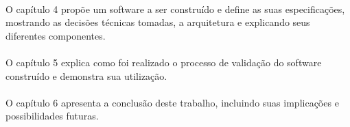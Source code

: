 \paragraph{}O capítulo 4 propõe um software a ser construído e define as suas especificações, mostrando as decisões técnicas tomadas, a arquitetura e explicando seus diferentes componentes.

\paragraph{}O capítulo 5 explica como foi realizado o processo de validação do software construído e demonstra sua utilização.

\paragraph{}O capítulo 6 apresenta a conclusão deste trabalho, incluindo suas implicações e possibilidades futuras.
